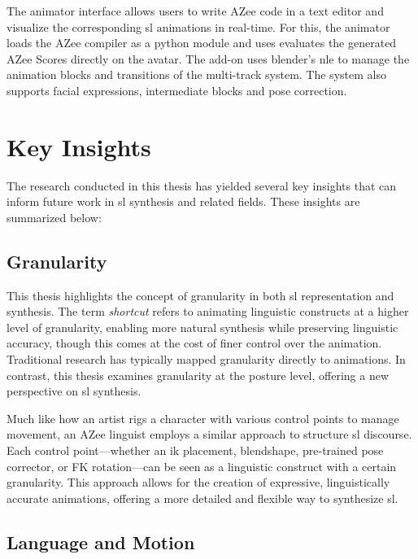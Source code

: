 \documentclass[../../main.tex]{subfiles}
\begin{document}
The animator interface allows users to write AZee code in a text editor and visualize the corresponding \gls{sl} animations in real-time. For this, the animator loads the AZee compiler as a python module and uses evaluates the generated AZee Scores directly on the avatar. The add-on uses blender's \gls{nle} to manage the animation blocks and transitions of the multi-track system. The system also supports facial expressions, intermediate blocks and pose correction.

\section{Key Insights}
\label{ch:conclusion:key_insights}

The research conducted in this thesis has yielded several key insights that can inform future work in \gls{sl} synthesis and related fields. These insights are summarized below:

\subsection{Granularity}
\label{ch:conclusion:key_insights:granularity}

This thesis highlights the concept of granularity in both \gls{sl} representation and synthesis. The term \emph{shortcut} refers to animating linguistic constructs at a higher level of granularity, enabling more natural synthesis while preserving linguistic accuracy, though this comes at the cost of finer control over the animation. Traditional research has typically mapped granularity directly to animations. In contrast, this thesis examines granularity at the posture level, offering a new perspective on \gls{sl} synthesis.

Much like how an artist rigs a character with various control points to manage movement, an AZee linguist employs a similar approach to structure \gls{sl} discourse. Each control point—whether an \gls{ik} placement, blendshape, pre-trained pose corrector, or FK rotation—can be seen as a linguistic construct with a certain granularity. This approach allows for the creation of expressive, linguistically accurate animations, offering a more detailed and flexible way to synthesize \gls{sl}.

\subsection{Language and Motion}
\label{ch:conclusion:key_insights:language_motion}
\end{document}
